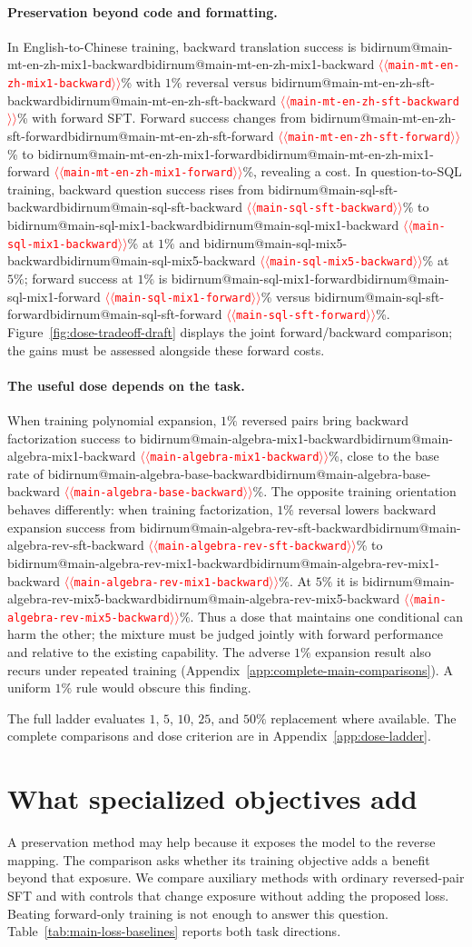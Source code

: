\documentclass[11pt]{article}
\makeatletter
\providecommand{\NUM}[1]{%
  \ifcsname bidirnum@#1\endcsname\csname bidirnum@#1\endcsname
  \else\textcolor{red}{$\langle\langle$\texttt{#1}$\rangle\rangle$}\fi}
\makeatother
\begin{document}
\paragraph{Preservation beyond code and formatting.}
In English-to-Chinese training, backward translation success is
\NUM{main-mt-en-zh-mix1-backward}\% with $1\%$ reversal versus
\NUM{main-mt-en-zh-sft-backward}\% with forward SFT. Forward success changes from
\NUM{main-mt-en-zh-sft-forward}\% to \NUM{main-mt-en-zh-mix1-forward}\%, revealing
a cost. In question-to-SQL training, backward question success rises from
\NUM{main-sql-sft-backward}\% to \NUM{main-sql-mix1-backward}\% at $1\%$ and
\NUM{main-sql-mix5-backward}\% at $5\%$; forward success at $1\%$ is
\NUM{main-sql-mix1-forward}\% versus \NUM{main-sql-sft-forward}\%.
Figure~\ref{fig:dose-tradeoff-draft} displays the joint forward/backward comparison;
the gains must be assessed alongside these forward costs.

\paragraph{The useful dose depends on the task.}
When training polynomial expansion, $1\%$ reversed pairs bring backward factorization
success to \NUM{main-algebra-mix1-backward}\%, close to the base rate of
\NUM{main-algebra-base-backward}\%. The opposite training orientation behaves differently:
when training factorization, $1\%$ reversal lowers backward expansion success from
\NUM{main-algebra-rev-sft-backward}\% to \NUM{main-algebra-rev-mix1-backward}\%.
At $5\%$ it is \NUM{main-algebra-rev-mix5-backward}\%. Thus a dose that maintains one
conditional can harm the other; the mixture must be judged jointly with forward performance
and relative to the existing capability. The adverse $1\%$ expansion result also recurs
under repeated training (Appendix~\ref{app:complete-main-comparisons}). A uniform $1\%$
rule would obscure this finding.

The full ladder evaluates $1$, $5$, $10$, $25$, and $50\%$ replacement where available.
The complete comparisons and dose criterion are in Appendix~\ref{app:dose-ladder}.

\section{What specialized objectives add}
\label{sec:attrib}

A preservation method may help because it exposes the model to the reverse mapping.
The comparison asks whether its training objective adds a benefit beyond that exposure.
We compare auxiliary
methods with ordinary reversed-pair SFT and with controls that change exposure without
adding the proposed loss. Beating forward-only training is not enough to answer this
question. Table~\ref{tab:main-loss-baselines} reports both task directions.
\end{document}

